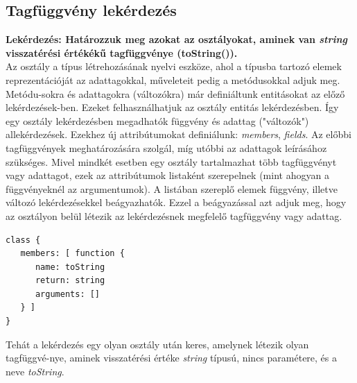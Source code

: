 \documentclass[a4paper,12pt]{report}
\begin{document}
\subsection{Tagfüggvény lekérdezés}
\textbf{Lekérdezés: Határozzuk meg azokat az osztályokat, aminek van \textit{string} visszatérési értékékű tagfüggvénye (toString()).}
\\
Az osztály a típus létrehozásának nyelvi eszköze, ahol a típusba tartozó elemek reprezentációját az adattagokkal, műveleteit pedig a metódusokkal adjuk meg. Metódu-sokra és adattagokra (változókra) már definiáltunk entitásokat az előző lekérdezések-ben. Ezeket felhasználhatjuk az osztály entitás lekérdezésben. Így egy osztály lekérdezésben megadhatók függvény és adattag ("változók") allekérdezések. Ezekhez új attribútumokat definiálunk: \textit{members}, \textit{fields}. Az előbbi tagfüggvények meghatározására szolgál, míg utóbbi az adattagok leírásához szükséges. Mivel mindkét esetben egy osztály tartalmazhat több tagfüggvényt vagy adattagot, ezek az attribútumok listaként szerepelnek (mint ahogyan a függvényeknél az argumentumok). A listában szereplő elemek függvény, illetve változó lekérdezésekkel beágyazhatók. Ezzel a beágyazással azt adjuk meg, hogy az osztályon belül létezik az lekérdezésnek megfelelő tagfüggvény vagy adattag.
\begin{verbatim}
class {
   members: [ function {
      name: toString
      return: string
      arguments: []
   } ]
}
\end{verbatim}
Tehát a lekérdezés egy olyan osztály után keres, amelynek létezik olyan tagfüggvé-nye, aminek visszatérési értéke \textit{string} típusú, nincs paramétere, és a neve \textit{toString}.
\end{document}
